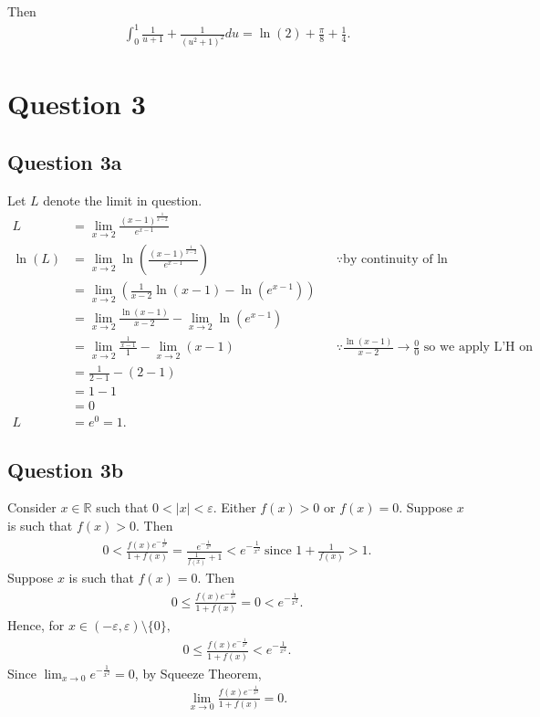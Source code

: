 \documentclass[12pt]{article}
\begin{document}
Then
\begin{align*}
    \int_0^1\frac{1}{u+1}+\frac{1}{(u^2+1)^2}du = \ln(2) + \frac{\pi}{8} + \frac{1}{4}.
\end{align*}

\newpage
\section*{Question 3}
\subsection*{Question 3a} Let $L$ denote the limit in question. 
\begin{align*}
    L &= \lim_{x\to 2}\frac{(x-1)^\frac{1}{x-2}}{e^{x-1}}\\
    \ln(L) &= \lim_{x\to 2}\ln\left(\frac{(x-1)^\frac{1}{x-2}}{e^{x-1}}\right) && \because\text{by continuity of ln}\\
    &= \lim_{x\to 2}\left(\frac{1}{x-2}\ln(x-1)-\ln\left(e^{x-1}\right)\right)\\
    &= \lim_{x\to 2}\frac{\ln(x-1)}{x-2}-\lim_{x\to 2}\ln(e^{x-1})\\
    &= \lim_{x\to 2}\frac{\frac{1}{x-1}}{1} - \lim_{x\to 2}(x-1) && \because\frac{\ln(x-1)}{x-2}\to \frac{0}{0} \text{ so we apply L'H on the first limit}\\
    &= \frac{1}{2-1} - (2-1)\\
    &= 1 - 1\\
    &= 0\\
    L &= e^0 = 1.
\end{align*}

\subsection*{Question 3b} Consider $x\in\mathbb{R}$ such that $0<|x|<\varepsilon$. Either $f(x)>0$ or $f(x)=0$. Suppose $x$ is such that $f(x)>0$. Then
\begin{align*}
    0<\frac{f(x)e^{-\frac{1}{x^2}}}{1+f(x)} = \frac{e^{-\frac{1}{x^2}}}{\frac{1}{f(x)}+ 1} < e^{-\frac{1}{x^2}} \:\text{since } 1+\frac{1}{f(x)}>1.
\end{align*}
Suppose $x$ is such that $f(x)=0$. Then
\begin{align*}
    0\leq \frac{f(x)e^{-\frac{1}{x^2}}}{1+f(x)} = 0 < e^{-\frac{1}{x^2}}.
\end{align*}
Hence, for $x\in (-\varepsilon, \varepsilon)\setminus \{0\},$
\begin{align*}
    0 \leq \frac{f(x)e^{-\frac{1}{x^2}}}{1+f(x)} < e^{-\frac{1}{x^2}}.
\end{align*}
Since $\lim_{x\to 0}e^{-\frac{1}{x^2}} = 0$, by Squeeze Theorem,
\begin{align*}
    \lim_{x\to 0}\frac{f(x)e^{-\frac{1}{x^2}}}{1+f(x)} = 0.
\end{align*}
\end{document}
